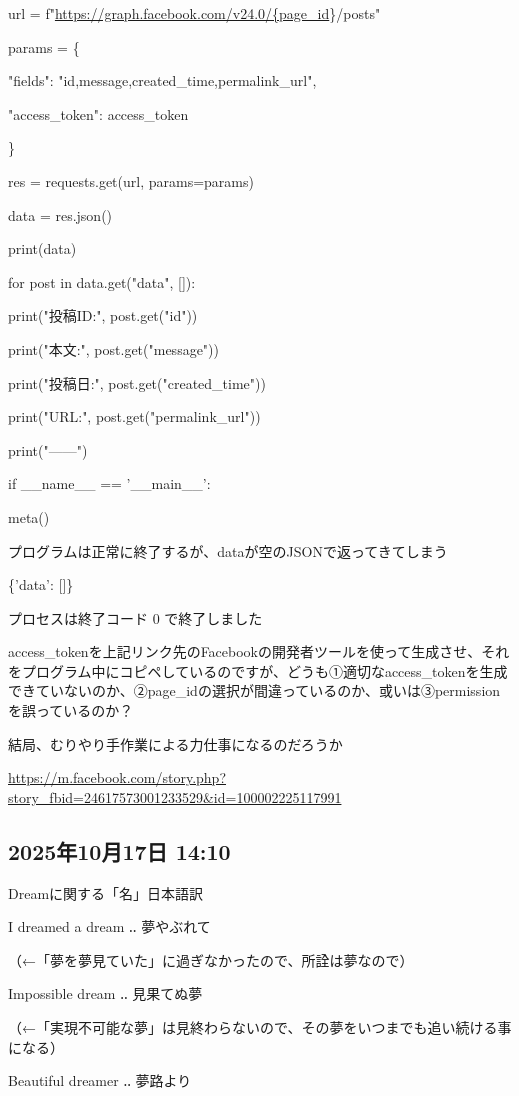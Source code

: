 url = f"\url{https://graph.facebook.com/v24.0/\{page_id}\}/posts"

params = \{

"fields": "id,message,created\_time,permalink\_url",

"access\_token": access\_token

\}

res = requests.get(url, params=params)

data = res.json()

print(data)

for post in data.get("data", []):

print("投稿ID:", post.get("id"))

print("本文:", post.get("message"))

print("投稿日:", post.get("created\_time"))

print("URL:", post.get("permalink\_url"))

print("------")

if \_\_name\_\_ == '\_\_main\_\_':

meta()

プログラムは正常に終了するが、dataが空のJSONで返ってきてしまう

\{'data': []\}

プロセスは終了コード 0 で終了しました

access\_tokenを上記リンク先のFacebookの開発者ツールを使って生成させ、それをプログラム中にコピペしているのですが、どうも①適切なaccess\_tokenを生成できていないのか、②page\_idの選択が間違っているのか、或いは③permissionを誤っているのか？

結局、むりやり手作業による力仕事になるのだろうか

\url{https://m.facebook.com/story.php?story_fbid=24617573001233529&id=100002225117991}

\subsection*{2025年10月17日 14:10}

Dreamに関する「名」日本語訳

I dreamed a dream ‥ 夢やぶれて

（←「夢を夢見ていた」に過ぎなかったので、所詮は夢なので）

Impossible dream ‥ 見果てぬ夢

（←「実現不可能な夢」は見終わらないので、その夢をいつまでも追い続ける事になる）

Beautiful dreamer ‥ 夢路より

